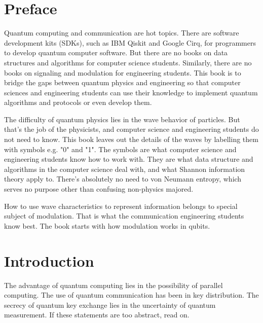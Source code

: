 \documentclass{book}
\begin{document}
\addtocounter{page}{2}

\chapter*{Preface}
Quantum computing and communication are hot topics. There are software development kits (SDKs), such as IBM Qiskit and Google Cirq, for programmers to develop quantum computer software. But there are no books on data structures and algorithms for computer science students. Similarly, there are no books on signaling and modulation for engineering students. This book is to bridge the gaps between quantum physics and engineering so that computer sciences and engineering students can use their knowledge to implement quantum algorithms and protocols or even develop them.

The difficulty of quantum physics lies in the wave behavior of particles. But that's the job of the physicists, and computer science and engineering students do not need to know. This book leaves out the details of the waves by labelling them with symbols e.g. "0" and "1". The symbols are what computer science and engineering students know how to work with. They are what data structure and algorithms in the computer science deal with, and what Shannon information theory apply to. There's absolutely no need to von Neumann entropy, which serves no purpose other than confusing non-physics majored.

How to use wave characteristics to represent information belongs to special subject of modulation. That is what  the communication engineering students know best. The book starts with how modulation works in qubits.

\setcounter{tocdepth}{3}
\tableofcontents

\mainmatter

\chapter{Introduction}
The advantage of quantum computing lies in the possibility of parallel computing. The use of quantum communication has been in key distribution. The secrecy of quantum key exchange lies in the uncertainty of quantum measurement. If these statements are too abstract, read on.
\end{document}
